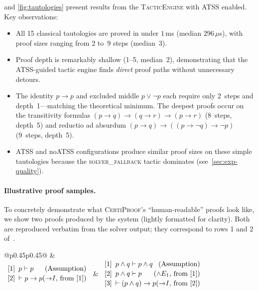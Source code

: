 \documentclass[acmtocl,review,anonymous]{acmart}
\newcommand{\CP}{\textsc{CertiProof}}
\newcommand{\ATSS}{\textsc{ATSS}}
\begin{document}
 and \cref{fig:tautologies} present results from the \textsc{TacticEngine}
with \ATSS{} enabled.  Key observations:
\begin{itemize}
  \item All 15 classical tautologies are proved in under
    $1$\,ms (median $296\,\mu$s), with proof sizes ranging from
    2 to~9 steps (median~3).
  \item Proof depth is remarkably shallow (1--5, median~2), demonstrating
    that the ATSS-guided tactic engine finds \emph{direct} proof
    paths without unnecessary detours.
  \item The identity $p \to p$ and excluded middle $p \vee \neg p$
    each require only 2~steps and depth~1---matching the
    theoretical minimum.  The deepest proofs occur on the transitivity
    formulas $(p \to q) \to (q \to r) \to (p \to r)$ (8~steps,
    depth~5) and reductio ad absurdum
    $(p \to q) \to ((p \to \neg q) \to \neg p)$ (9~steps, depth~5).
  \item ATSS and noATSS configurations produce similar proof sizes
    on these simple tautologies because the \textsc{solver\_fallback}
    tactic dominates (see~\cref{sec:exp-quality}).
\end{itemize}

\paragraph{Illustrative proof samples.}
To concretely demonstrate what \CP{}'s ``human-readable'' proofs
look like, we show two proofs produced by the system (lightly formatted
for clarity).  Both are reproduced verbatim from the solver output;
they correspond to rows 1 and 2 of~.

\begin{center}\footnotesize
\begin{tabular}{@{}p{}p{}@{}}
\toprule
{}
&  \\
\midrule
$\begin{array}{l@{\hspace{0.5em}}l}
\text{[1]}& p \vdash p \hfill \text{(Assumption)}\\[2pt]
\text{[2]}& \vdash p \to p \hfill
  \text{(${\to}I$, from [1])}
\end{array}$
&
$\begin{array}{l@{\hspace{0.5em}}l}
\text{[1]}& p \land q \vdash p \land q \hfill
  \text{(Assumption)}\\[2pt]
\text{[2]}& p \land q \vdash p \hfill
  \text{(${\land}E_1$, from [1])}\\[2pt]
\text{[3]}& \vdash (p \land q) \to p \hfill
  \text{(${\to}I$, from [2])}
\end{array}$ \\
\bottomrule
\end{tabular}
\end{center}
\end{document}
